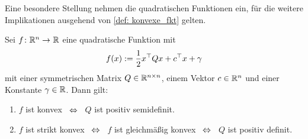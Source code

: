 \documentclass[ %
ngerman, %
a4paper, 
12pt,%
sectionreset, %
chapterstyle=framed, %
sectionstyle=pure, %
titlefont=osfamily %
]{../texmf/tex/latex/mathscriptMathTUD/mathscriptMathTUD}
\begin{document}
\pagebreak

Eine besondere Stellung nehmen die quadratischen Funktionen ein, für die weitere Implikationen ausgehend von \cref{def: konvexe_fkt} gelten.

\begin{lemma} \label{lemma: quadratischeFunktion}
	Sei $\abb{f}{\Rn}{\R}$ eine quadratische Funktion mit
	\begin{align*}
		f(x) \mathrel{:=} \frac{1}{2} x^{\top} Q x + c^{\top} x + \gamma
	\end{align*}
	mit einer symmetrischen Matrix $Q \in \mathbb{R}^{n \times n}$, einem Vektor $c \in \mathbb{R}^n$ und einer Konstante $\gamma \in \mathbb{R}$. Dann gilt:
	\begin{enumerate}[leftmargin=*, label=(\roman*), nolistsep]
		\item $f$ ist konvex $\enskip \Leftrightarrow \enskip$ $Q$ ist positiv semidefinit.
		\item $f$ ist strikt konvex $\enskip \Leftrightarrow \enskip$ $f$ ist gleichmäßig konvex $\enskip \Leftrightarrow \enskip$ $Q$ ist positiv definit.
	\end{enumerate}
\end{lemma}
\end{document}
